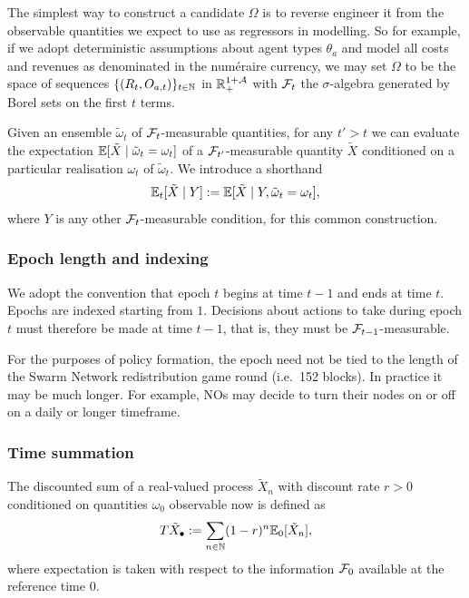 \begin{example}

  The simplest way to construct a candidate $\Omega$ is to reverse engineer it from the observable quantities we expect to use as regressors in modelling.
  So for example, if we adopt deterministic assumptions about agent types $\theta_a$ and model all costs and revenues as denominated in the num\'eraire currency, we may set $\Omega$ to be the space of sequences $\{(R_t,O_{a,t})\}_{t\in\mathbb{N}}$ in $\mathbb{R}_+^{1+\mathcal{A}}$ with $\mathcal{F}_t$ the $\sigma$-algebra generated by Borel sets on the first $t$ terms.

\end{example}

Given an ensemble $\tilde\omega_t$ of $\mathcal{F}_t$-measurable quantities, for any $t'>t$ we can evaluate the expectation $\mathbb{E}[\tilde{X}\mid \tilde\omega_t=\omega_t]$ of a $\mathcal{F}_{t'}$-measurable quantity $\tilde{X}$ conditioned on a particular realisation $\omega_t$ of $\tilde\omega_t$.
%
We introduce a shorthand
\[
  \mathbb{E}_t[\tilde{X}\mid Y] := \mathbb{E}[\tilde{X}\mid Y,\tilde\omega_t=\omega_t],
\]
%
where $Y$ is any other $\mathcal{F}_t$-measurable condition, for this common construction.


\subsubsection{Epoch length and indexing}
%
We adopt the convention that epoch $t$ begins at time $t-1$ and ends at time $t$.
%
Epochs are indexed starting from $1$.
%
Decisions about actions to take during epoch $t$ must therefore be made at time $t-1$, that is, they must be $\mathcal{F}_{t-1}$-measurable.

For the purposes of policy formation, the epoch need not be tied to the length of the Swarm Network redistribution game round (i.e.~152 blocks).
%
In practice it may be much longer.
%
For example, NOs may decide to turn their nodes on or off on a daily or longer timeframe.

\subsubsection{Time summation}
%
The discounted sum of a real-valued process $\tilde{X}_n$ with discount rate $r>0$ conditioned on quantities $\omega_0$ observable now is defined as
\[
  T\tilde{X}_\bullet := \sum_{n\in\mathbb{N}}(1-r)^n\mathbb{E}_0[\tilde{X}_n],
\]
where expectation is taken with respect to the information $\mathcal{F}_0$ available at the reference time $0$.

